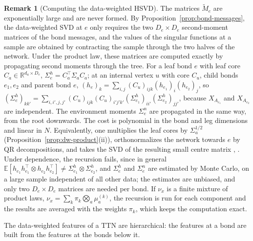 \documentclass[11pt]{article}
\newcommand{\R}{\mathbb{R}}
\newcommand{\E}{\mathbb{E}}
\theoremstyle{definition}
\newtheorem{remark}[theorem]{Remark}
\numberwithin{equation}{section}
\begin{document}
\begin{remark}[Computing the data-weighted HSVD]\label{rem:dw-compute}
The matrices $\tilde M_e$ are exponentially large and are never formed. By Proposition~\ref{prop:bond-messages}, the data-weighted SVD at $e$ only requires the two $D_e\times D_e$ second-moment matrices of the bond messages, and the values of the singular functions at a sample are obtained by contracting the sample through the two halves of the network. Under the product law, these matrices are computed exactly by propagating second moments through the tree. For a leaf bond $e$ with leaf core $C_a\in\R^{d_a\times D_e}$, $\Sigma^h_e=C_a^\top\Sigma_aC_a$; at an internal vertex $u$ with core $C_u$, child bonds $e_1,e_2$ and parent bond $e$, $(h_e)_k=\sum_{i,j}(C_u)_{ijk}(h_{e_1})_i(h_{e_2})_j$, so $(\Sigma^h_e)_{kk'}=\sum_{i,i',j,j'}(C_u)_{ijk}(C_u)_{i'j'k'}(\Sigma^h_{e_1})_{ii'}(\Sigma^h_{e_2})_{jj'}$, because $X_{A_{e_1}}$ and $X_{A_{e_2}}$ are independent. The environment moments $\Sigma^n_e$ are propagated in the same way, from the root downwards. The cost is polynomial in the bond and leg dimensions and linear in $N$. Equivalently, one multiplies the leaf cores by $\Sigma_a^{1/2}$ (Proposition~\ref{prop:dw-product}(ii)), orthonormalizes the network towards $e$ by QR decompositions, and takes the SVD of the resulting small centre matrix \citep{grasedyck2010hierarchical}, \citep[Section~9.2]{hfl_diagonal}. Under dependence, the recursion fails, since in general $\E[h_{e_1}h_{e_1}^\top\otimes h_{e_2}h_{e_2}^\top]\neq\Sigma^h_{e_1}\otimes\Sigma^h_{e_2}$, and $\Sigma^h_e$ and $\Sigma^n_e$ are estimated by Monte Carlo, on a large sample independent of all other data; the estimates are unbiased, and only two $D_e\times D_e$ matrices are needed per bond. If $\nu_x$ is a finite mixture of product laws, $\nu_x=\sum_k\pi_k\bigotimes_a\mu^{(k)}_a$, the recursion is run for each component and the results are averaged with the weights $\pi_k$, which keeps the computation exact.
\end{remark}

The data-weighted features of a TTN are hierarchical: the features at a bond are built from the features at the bonds below it.
\end{document}
